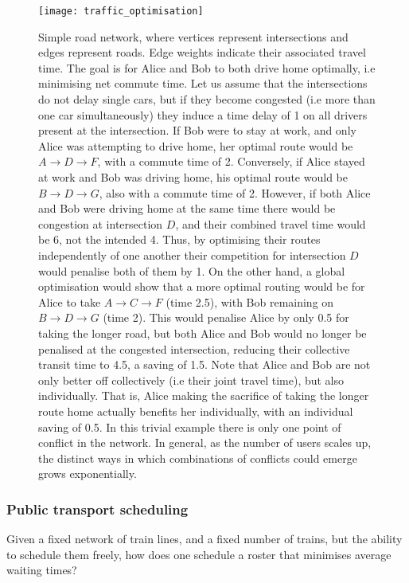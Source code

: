 \begin{figure}[!htb]
	\texttt{[image: traffic\_optimisation]}
	\caption{Simple road network, where vertices represent intersections and edges represent roads. Edge weights indicate their associated travel time. The goal is for Alice and Bob to both drive home optimally, i.e minimising net commute time. Let us assume that the intersections do not delay single cars, but if they become congested (i.e more than one car simultaneously) they induce a time delay of 1 on all drivers present at the intersection. If Bob were to stay at work, and only Alice was attempting to drive home, her optimal route would be \mbox{$A\to D\to F$}, with a commute time of 2. Conversely, if Alice stayed at work and Bob was driving home, his optimal route would be \mbox{$B\to D\to G$}, also with a commute time of 2. However, if both Alice and Bob were driving home at the same time there would be congestion at intersection $D$, and their combined travel time would be 6, not the intended 4. Thus, by optimising their routes independently of one another their competition for intersection $D$ would penalise both of them by 1. On the other hand, a global optimisation would show that a more optimal routing would be for Alice to take \mbox{$A\to C\to F$} (time 2.5), with Bob remaining on \mbox{$B\to D\to G$} (time 2). This would penalise Alice by only 0.5 for taking the longer road, but both Alice and Bob would no longer be penalised at the congested intersection, reducing their collective transit time to 4.5, a saving of 1.5. Note that Alice and Bob are not only better off collectively (i.e their joint travel time), but also individually. That is, Alice making the sacrifice of taking the longer route home actually benefits her individually, with an individual saving of 0.5. In this trivial example there is only one point of conflict in the network. In general, as the number of users scales up, the distinct ways in which combinations of conflicts could emerge grows exponentially.}\label{fig:traffic_opt}
\end{figure}

\subsubsection{Public transport scheduling}

Given a fixed network of train lines, and a fixed number of trains, but the ability to schedule them freely, how does one schedule a roster that minimises average waiting times?

